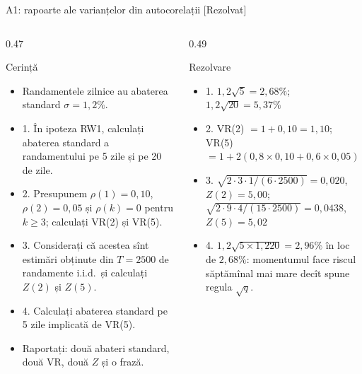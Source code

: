 \begin{frame}{A1: rapoarte ale varianțelor din autocorelații [Rezolvat]}
\itemsize{\scriptsize}
\begin{columns}[T]
\begin{column}{0.47\textwidth}
\begin{block}{Cerință}
\begin{itemize}
    \item Randamentele zilnice au abaterea standard $\sigma = 1{,}2\%$.
    \item 1. În ipoteza RW1, calculați abaterea standard a randamentului pe 5 zile și pe 20 de zile.
    \item 2. Presupunem $\rho(1) = 0{,}10$, $\rho(2) = 0{,}05$ și $\rho(k) = 0$ pentru $k \ge 3$; calculați VR(2) și VR(5).
    \item 3. Considerați că acestea sînt estimări obținute din $T = 2500$ de randamente i.i.d.\ și calculați $Z(2)$ și $Z(5)$.
    \item 4. Calculați abaterea standard pe 5 zile implicată de VR(5).
    \item Raportați: două abateri standard, două VR, două $Z$ și o frază.
\end{itemize}
\end{block}
\end{column}
\begin{column}{0.49\textwidth}
\begin{exampleblock}{Rezolvare}
\begin{itemize}
    \item 1. $1{,}2\sqrt5 = 2{,}68\%$; $1{,}2\sqrt{20} = 5{,}37\%$
    \item 2. VR(2) $= 1 + 0{,}10 = 1{,}10$; VR(5) $= 1 + 2(0{,}8 \times 0{,}10 + 0{,}6 \times 0{,}05) = 1{,}220$
    \item 3. $\sqrt{2 \cdot 3 \cdot 1/(6 \cdot 2500)} = 0{,}020$, $Z(2) = 5{,}00$; $\sqrt{2 \cdot 9 \cdot 4/(15 \cdot 2500)} = 0{,}0438$, $Z(5) = 5{,}02$
    \item 4. $1{,}2\sqrt{5 \times 1{,}220} = 2{,}96\%$ în loc de $2{,}68\%$: momentumul face riscul săptămînal mai mare decît spune regula $\sqrt{q}$.
\end{itemize}
\end{exampleblock}
\end{column}
\end{columns}
\end{frame}

